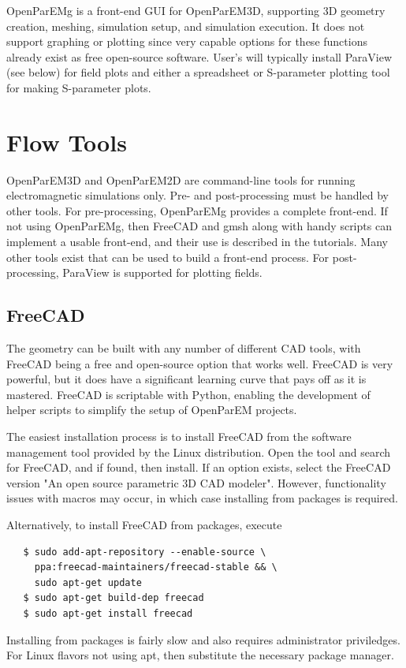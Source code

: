\documentclass[titlepage]{article}
\renewcommand\_{\textunderscore\linebreak[1]}
\begin{document}
OpenParEMg is a front-end GUI for OpenParEM3D, supporting 3D geometry creation, meshing, simulation setup, and simulation execution.  It does not support graphing or plotting since very capable options for these functions already exist as free open-source software.  User's will typically install ParaView (see below) for field plots and either a spreadsheet or S-parameter plotting tool for making S-parameter plots.

\section{Flow Tools}

OpenParEM3D and OpenParEM2D are command-line tools for running electromagnetic simulations only.  Pre- and post-processing must be handled by other tools.  For pre-processing, OpenParEMg provides a complete front-end.  If not using OpenParEMg, then FreeCAD and gmsh along with handy scripts can implement a usable front-end, and their use is described in the tutorials. Many other tools exist that can be used to build a front-end process.  For post-processing, ParaView is supported for plotting fields.

\subsection{FreeCAD}
\label{sec:freecad}

The geometry can be built with any number of different CAD tools, with FreeCAD \cite{freecad} being a free and open-source option that works well.  FreeCAD is very powerful, but it does have a significant learning curve that pays off as it is mastered.  FreeCAD is scriptable with Python, enabling the development of helper scripts to simplify the setup of OpenParEM projects.

The easiest installation process is to install FreeCAD from the software management tool provided by the Linux distribution.  Open the tool and search for FreeCAD, and if found, then install.  If an option exists, select the FreeCAD version "An open source parametric 3D CAD modeler".  However, functionality issues with macros may occur, in which case installing from packages is required.

Alternatively, to install FreeCAD from packages, execute
\begin{verbatim}
   $ sudo add-apt-repository --enable-source \
     ppa:freecad-maintainers/freecad-stable && \
     sudo apt-get update
   $ sudo apt-get build-dep freecad
   $ sudo apt-get install freecad
\end{verbatim}
Installing from packages is fairly slow and also requires administrator priviledges.  For Linux flavors not using apt, then substitute the necessary package manager.
\end{document}

